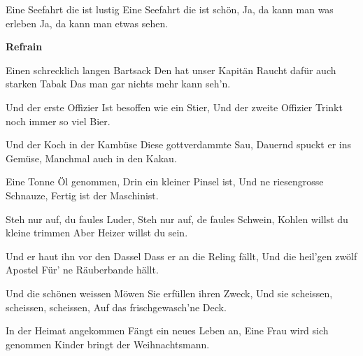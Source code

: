 \footnotemark [
ititle={Seefahrt, eine}]


\beginverse
Eine Seefahrt die ist lustig
Eine Seefahrt die ist schön,
Ja, da kann man was erleben
Ja, da kann man etwas sehen.
\endverse

\beginchorus
\textbf{Refrain}
\endchorus

\beginverse
Einen schrecklich langen Bartsack
Den hat unser Kapitän
Raucht dafür auch starken Tabak
Das man gar nichts mehr kann seh'n.
\endverse

\beginverse
Und der erste Offizier
Ist besoffen wie ein Stier,
Und der zweite Offizier
Trinkt noch immer so viel Bier.
\endverse

\beginverse
Und der Koch in der Kambüse
Diese gottverdammte Sau,
Dauernd spuckt er ins Gemüse,
Manchmal auch in den Kakau.
\endverse

\beginverse
Eine Tonne Öl genommen,
Drin ein kleiner Pinsel ist,
Und ne riesengrosse Schnauze,
Fertig ist der Maschinist.
\endverse

\beginverse
Steh nur auf, du faules Luder,
Steh nur auf, de faules Schwein,
Kohlen willst du kleine trimmen
Aber Heizer willst du sein.
\endverse

\beginverse
Und er haut ihn vor den Dassel
Dass er an die Reling fällt,
Und die heil'gen zwölf Apostel
Für' ne Räuberbande hällt.
\endverse

\beginverse
Und die schönen weissen Möwen
Sie erfüllen ihren Zweck,
Und sie scheissen, scheissen, scheissen,
Auf das frischgewasch'ne Deck.
\endverse

\beginverse
In der Heimat angekommen
Fängt ein neues Leben an,
Eine Frau wird sich genommen
Kinder bringt der Weihnachtsmann.
\endverse
\endsong